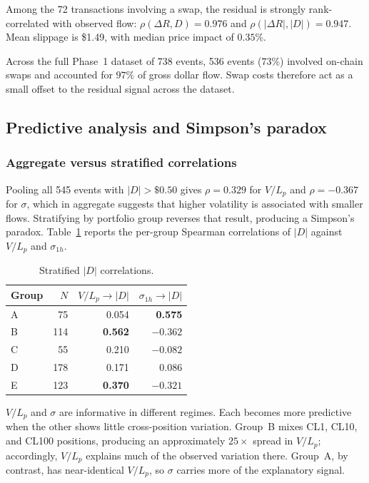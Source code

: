 \documentclass{manuscript}
\begin{document}
Among the 72 transactions involving a swap, the residual is strongly rank-correlated with observed flow: $\rho(\Delta R, D) = 0.976$ and $\rho(|\Delta R|, |D|) = 0.947$. Mean slippage is \$1.49, with median price impact of $0.35\%$.

Across the full Phase~1 dataset of 738 events, 536 events ($73\%$) involved on-chain swaps and accounted for $97\%$ of gross dollar flow. Swap costs therefore act as a small offset to the residual signal across the dataset.

\subsection{Predictive analysis and Simpson's paradox}\label{sec:predictive}

\subsubsection{Aggregate versus stratified correlations}

Pooling all 545 events with $|D| > \$0.50$ gives $\rho = 0.329$ for $V/L_p$ and $\rho = -0.367$ for $\sigma$, which in aggregate suggests that higher volatility is associated with smaller flows. Stratifying by portfolio group reverses that result, producing a Simpson's paradox. Table~\ref{tab:stratified-correlations} reports the per-group Spearman correlations of $|D|$ against $V/L_p$ and $\sigma_{1h}$.

\begin{table}[H]
\centering
\vspace{-10pt}\caption{Stratified $|D|$ correlations.}
\label{tab:stratified-correlations}
\begin{tabular}{@{}lrrr@{}}
\toprule
Group & $N$ & $V/L_p \to |D|$ & $\sigma_{1h} \to |D|$ \\
\midrule
A & 75  & 0.054           & \textbf{0.575} \\
B & 114 & \textbf{0.562}  & $-0.362$ \\
C & 55  & 0.210           & $-0.082$ \\
D & 178 & 0.171           & $0.086$ \\
E & 123 & \textbf{0.370}  & $-0.321$ \\
\bottomrule
\end{tabular}
\end{table}

$V/L_p$ and $\sigma$ are informative in different regimes. Each becomes more predictive when the other shows little cross-position variation. Group~B mixes CL1, CL10, and CL100 positions, producing an approximately $25\times$ spread in $V/L_p$; accordingly, $V/L_p$ explains much of the observed variation there. Group~A, by contrast, has near-identical $V/L_p$, so $\sigma$ carries more of the explanatory signal.
\end{document}
